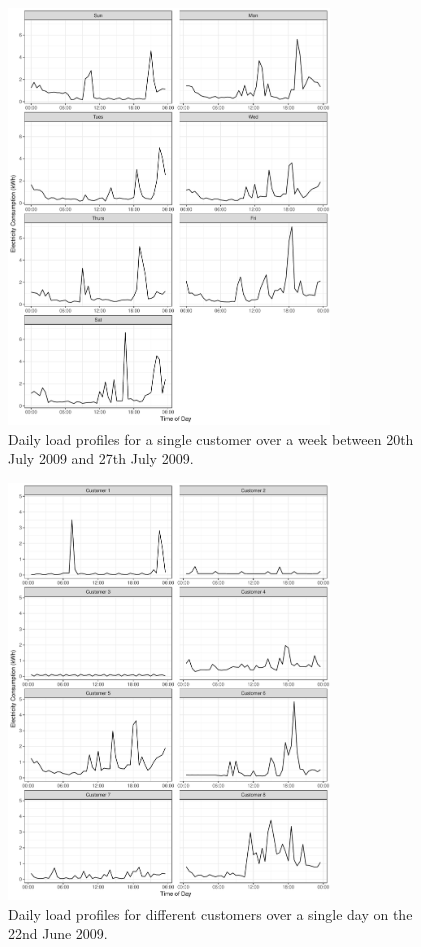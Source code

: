 \begin{figure}
	\includegraphics[width=0.76\textwidth]{Chapter5/figures/Rplot01}
	\caption{Daily load profiles for a single customer over a week between 20th July 2009 and 27th July 2009.}
	\label{fig:single_user}
\end{figure}

\begin{figure}
	\includegraphics[width=0.76\textwidth]{Chapter5/figures/Rplot02}
	\caption{Daily load profiles for different customers over a single day on the 22nd June 2009.}
	\label{fig:multiple_users}
\end{figure}

